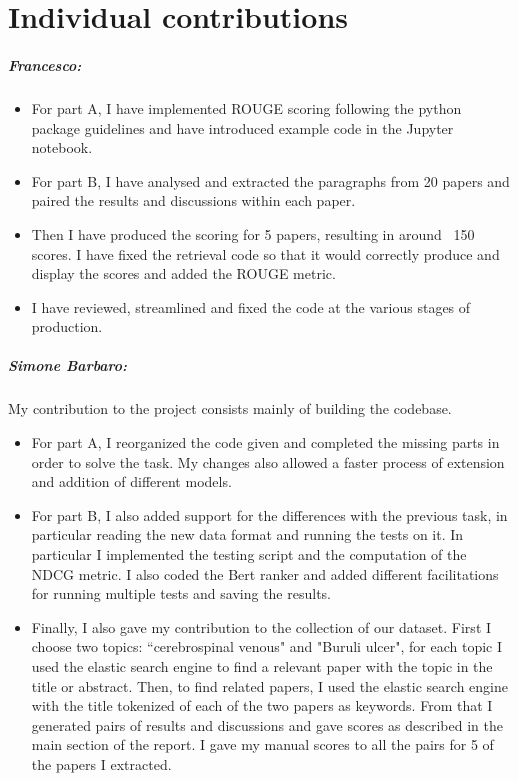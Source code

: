 \chapter{Individual contributions}

\paragraph{Francesco:}
\begin{itemize}
	\item For part A, I have implemented ROUGE scoring following the python package guidelines and have introduced example code in the Jupyter notebook. 
	\item For part B, I have analysed and extracted the paragraphs from 20 papers and paired the results and discussions within each paper. 
	\item Then I have produced the scoring for 5 papers, resulting in around ~150 scores. I have fixed the retrieval code so that it would correctly produce and display the scores and added the ROUGE metric. 
	\item 	I have reviewed, streamlined and fixed the code at the various stages of production.
\end{itemize}

\paragraph{Simone Barbaro:}
My contribution to the project consists mainly of building the codebase. 
\begin{itemize}
	\item For part A, I reorganized the code given and completed the missing parts in order to solve the task. My changes also allowed a faster process of extension and addition of different models. 
	\item For part B, I also added support for the differences with the previous task, in particular reading the new data format and running the tests on it. In particular I implemented the testing script and the computation of the NDCG metric. I also coded the Bert ranker and added different facilitations for running multiple tests and saving the results.
	\item Finally, I also gave my contribution to the collection of our dataset. First I choose two topics: “cerebrospinal venous" and "Buruli ulcer", for each topic I used the elastic search engine to find a relevant paper with the topic in the title or abstract.
	Then, to find related papers, I used the elastic search engine with the title tokenized of each of the two papers as keywords. From that I generated pairs of results and discussions and gave scores as described in the main section of the report. I gave my manual scores to all the pairs for 5 of the papers I extracted.
\end{itemize}

